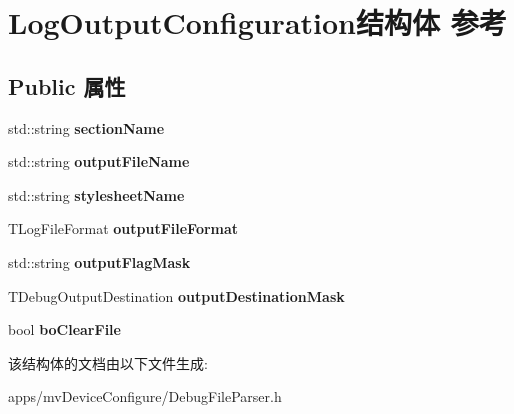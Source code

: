 \hypertarget{struct_log_output_configuration}{\section{Log\+Output\+Configuration结构体 参考}
\label{struct_log_output_configuration}
}
\subsection*{Public 属性}
\begin{DoxyCompactItemize}
\item 
\hypertarget{struct_log_output_configuration_a1447d733f25a4eba66998fc78dd525a2}{std\+::string {\bfseries section\+Name}}\label{struct_log_output_configuration_a1447d733f25a4eba66998fc78dd525a2}

\item 
\hypertarget{struct_log_output_configuration_ac9e5e13368aa8e6f2479b6a4eb3e084b}{std\+::string {\bfseries output\+File\+Name}}\label{struct_log_output_configuration_ac9e5e13368aa8e6f2479b6a4eb3e084b}

\item 
\hypertarget{struct_log_output_configuration_a7f0220ca8fa907e2824444281d25d4bd}{std\+::string {\bfseries stylesheet\+Name}}\label{struct_log_output_configuration_a7f0220ca8fa907e2824444281d25d4bd}

\item 
\hypertarget{struct_log_output_configuration_a3b27ee67c93456c87df9e1486fce0d8d}{T\+Log\+File\+Format {\bfseries output\+File\+Format}}\label{struct_log_output_configuration_a3b27ee67c93456c87df9e1486fce0d8d}

\item 
\hypertarget{struct_log_output_configuration_abb391316a1331376542fe4a6bb777f62}{std\+::string {\bfseries output\+Flag\+Mask}}\label{struct_log_output_configuration_abb391316a1331376542fe4a6bb777f62}

\item 
\hypertarget{struct_log_output_configuration_a1373371c82055afeac3491c3a88a912c}{T\+Debug\+Output\+Destination {\bfseries output\+Destination\+Mask}}\label{struct_log_output_configuration_a1373371c82055afeac3491c3a88a912c}

\item 
\hypertarget{struct_log_output_configuration_ade6455d40a1a0101327435f6cdbecd81}{bool {\bfseries bo\+Clear\+File}}\label{struct_log_output_configuration_ade6455d40a1a0101327435f6cdbecd81}

\end{DoxyCompactItemize}


该结构体的文档由以下文件生成\+:\begin{DoxyCompactItemize}
\item 
apps/mv\+Device\+Configure/Debug\+File\+Parser.\+h\end{DoxyCompactItemize}
